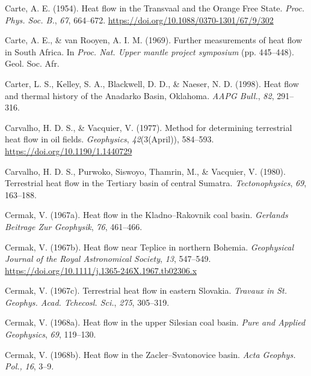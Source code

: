 \documentclass[draft,linenumbers]{agujournal2018}
\begin{document}
\leavevmode{}%
Carte, A. E. (1954). Heat flow in the {Transvaal} and the {Orange Free
State}. \emph{Proc. Phys. Soc. B.}, \emph{67}, 664--672.
\url{https://doi.org/10.1088/0370-1301/67/9/302}

\leavevmode{}%
Carte, A. E., \& van Rooyen, A. I. M. (1969). Further measurements of
heat flow in {South Africa}. In \emph{Proc. Nat. Upper mantle project
symposium} (pp. 445--448). Geol. Soc. Afr.

\leavevmode{}%
Carter, L. S., Kelley, S. A., Blackwell, D. D., \& Naeser, N. D. (1998).
Heat flow and thermal history of the {Anadarko Basin, Oklahoma}.
\emph{AAPG Bull.}, \emph{82}, 291--316.

\leavevmode{}%
Carvalho, H. D. S., \& Vacquier, V. (1977). Method for determining
terrestrial heat flow in oil fields. \emph{{Geophysics}},
\emph{42}(3(April)), 584--593. \url{https://doi.org/10.1190/1.1440729}

\leavevmode{}%
Carvalho, H. D. S., Purwoko, Siswoyo, Thamrin, M., \& Vacquier, V.
(1980). Terrestrial heat flow in the {Tertiary} basin of central
{Sumatra}. \emph{Tectonophysics}, \emph{69}, 163--188.

\leavevmode{}%
Cermak, V. (1967a). Heat flow in the {Kladno--Rakovnik} coal basin.
\emph{Gerlands Beitrage Zur Geophysik}, \emph{76}, 461--466.

\leavevmode{}%
Cermak, V. (1967b). Heat flow near {Teplice} in northern {Bohemia}.
\emph{Geophysical Journal of the Royal Astronomical Society}, \emph{13},
547--549. \url{https://doi.org/10.1111/j.1365-246X.1967.tb02306.x}

\leavevmode{}%
Cermak, V. (1967c). Terrestrial heat flow in eastern {Slovakia}.
\emph{Travaux in St. Geophys. Acad. Tchecosl. Sci.}, \emph{275},
305--319.

\leavevmode{}%
Cermak, V. (1968a). Heat flow in the upper {Silesian} coal basin.
\emph{Pure and Applied Geophysics}, \emph{69}, 119--130.

\leavevmode{}%
Cermak, V. (1968b). Heat flow in the {Zacler--Svatonovice} basin.
\emph{Acta Geophys. Pol.,} \emph{16}, 3--9.
\end{document}
